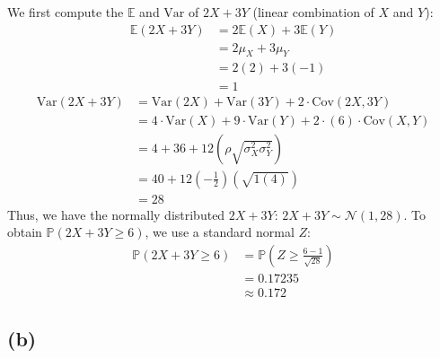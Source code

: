 \documentclass[12pt]{article}
\begin{document}
We first compute the $ \mathbb{E}$ and $\text{Var}$ of $2X + 3Y$ (linear combination of $X$ and $Y$): \begin{align*}
    \mathbb{E}(2X + 3Y) &= 2 \mathbb{E}(X) + 3 \mathbb{E}(Y) \\
    &= 2\mu_X + 3\mu_Y \\ 
    &= 2(2) + 3(-1) \\ 
    &= 1
\end{align*} \begin{align*}
    \text{Var}(2X+3Y) &= \text{Var}(2X) + \text{Var}(3Y) + 2 \cdot \text{Cov}(2X, 3Y) \\ 
    &= 4 \cdot \text{Var}(X) + 9 \cdot \text{Var}(Y) + 2 \cdot (6) \cdot \text{Cov} (X,Y) \\ 
    &= 4 + 36 + 12\left(\rho \sqrt{\sigma_X^{2}\sigma_Y^{2}}\right) \\ 
    &= 40 + 12(-\frac{1}{2})\left( \sqrt{1(4)} \right) \\ 
    &= 28
\end{align*} Thus, we have the normally distributed $2X + 3Y$: $2X + 3Y \sim \mathcal{N}(1,28)$. To obtain $ \mathbb{P}(2X + 3Y \geq 6)$, we use a standard normal $Z$: \begin{align*}
    \mathbb{P}(2X + 3Y \geq 6) &= \mathbb{P}\left(Z \geq \frac{6-1}{\sqrt{28}}\right) \\ 
    &= 0.17235 \\ 
    &\boxed{\approx 0.172}
\end{align*}

\subsection*{(b)}
\end{document}
